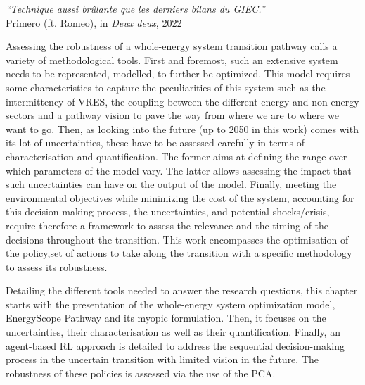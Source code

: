 \vspace{-0.2cm}
\begin{flushright}
\emph{``Technique aussi brûlante que les derniers bilans du GIEC.''}\\
 Primero (ft. Romeo), in \textit{Deux deux}, 2022
\end{flushright}
\vspace{0.4cm}
%
%
%

Assessing the robustness of a whole-energy system transition pathway calls a variety of methodological tools. First and foremost, such an extensive system needs to be represented, \ie modelled, to further be optimized. This model requires some characteristics to capture the peculiarities of this system such as the intermittency of \gls{VRES}, the coupling between the different energy and non-energy sectors and a pathway vision to pave the way from where we are to where we want to go.  Then, as looking into the future (\ie up to 2050 in this work) comes with its lot of uncertainties, these have to be assessed carefully in terms of characterisation and quantification. The former aims at defining the range over which parameters of the model vary. The latter allows assessing the impact that such uncertainties can have on the output of the model. Finally, meeting the environmental objectives while minimizing the cost of the system, accounting for this decision-making process, the uncertainties, and potential shocks/crisis, require therefore a framework to assess the relevance and the timing of the decisions throughout the transition. This work encompasses the optimisation of the policy,\ie set of actions to take along the transition with a specific methodology to assess its robustness. 

Detailing the different tools needed to answer the research questions, this chapter starts with the presentation of the whole-energy system optimization model, EnergyScope Pathway and its myopic formulation. Then, it focuses on the uncertainties, their characterisation as well as their quantification. Finally, an agent-based \acrfull{RL} approach is detailed to address the sequential decision-making process in the uncertain transition with limited vision in the future. The robustness of these policies is assessed via the use of the \gls{PCA}.

